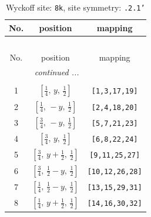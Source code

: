 \documentclass[fleqn,8pt]{jsarticle}
\begin{document}
\begin{longtable}{ccc}
\caption{Wyckoff site: {\tt 8k}, site symmetry: {\tt .2.1'}}
 \\
 \hline \hline
No. & position & mapping \\ \hline \endfirsthead

\multicolumn{2}{l}{\tablename\ \thetable{}} \\
 \hline \hline
No. & position & mapping \\ \hline \endhead

 \hline \hline
\multicolumn{2}{r}{\footnotesize\it continued ...} \\ \endfoot

 \hline \hline
\multicolumn{2}{r}{} \\ \endlastfoot

1 & $\left[ \frac{1}{4},\, y,\, \frac{1}{2} \right]$ & {\tt [1,3,17,19]} \\ \hline
2 & $\left[ \frac{1}{4},\, - y,\, \frac{1}{2} \right]$ & {\tt [2,4,18,20]} \\ \hline
3 & $\left[ \frac{3}{4},\, - y,\, \frac{1}{2} \right]$ & {\tt [5,7,21,23]} \\ \hline
4 & $\left[ \frac{3}{4},\, y,\, \frac{1}{2} \right]$ & {\tt [6,8,22,24]} \\ \hline
5 & $\left[ \frac{3}{4},\, y + \frac{1}{2},\, \frac{1}{2} \right]$ & {\tt [9,11,25,27]} \\ \hline
6 & $\left[ \frac{3}{4},\, \frac{1}{2} - y,\, \frac{1}{2} \right]$ & {\tt [10,12,26,28]} \\ \hline
7 & $\left[ \frac{1}{4},\, \frac{1}{2} - y,\, \frac{1}{2} \right]$ & {\tt [13,15,29,31]} \\ \hline
8 & $\left[ \frac{1}{4},\, y + \frac{1}{2},\, \frac{1}{2} \right]$ & {\tt [14,16,30,32]} \\
\end{longtable}
\renewcommand{\arraystretch}{1.2}
\end{document}
